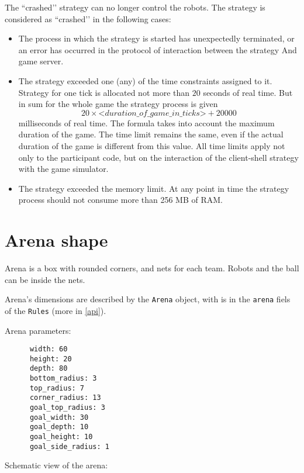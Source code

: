 The ``crashed’’ strategy can no longer control the robots. The strategy is considered as ``crashed’’ in the following cases:
\begin{itemize}
\item The process in which the strategy is started has unexpectedly terminated, or an error has occurred in the protocol of interaction between the strategy
      And game server.
\item The strategy exceeded one (any) of the time constraints assigned to it. Strategy for one tick is allocated not more than $20$ seconds
      of real time. But in sum for the whole game the strategy process is given
      \begin{equation}
      20\times\textit{<duration\_of\_game\_in\_ticks>}+20000
      \end{equation}
      milliseconds of real time.
      The formula takes into account the maximum duration of the game. The time limit remains the same, even if
      the actual duration of the game is different from this value. All time limits apply not only to the participant code, but
      on the interaction of the client-shell strategy with the game simulator.
\item The strategy exceeded the memory limit. At any point in time the strategy process should not consume more than 256 MB of RAM.
\end{itemize}

\section{Arena shape}\label{arena_form}

Arena is a box with rounded corners, and nets for each team. Robots and the ball can be inside the nets.

Arena's dimensions are described by the \texttt{Arena} object, with is in the \texttt{arena} fiels of the \texttt{Rules} (more in \ref{api}).

Arena parameters:

\begin{verbatim}
      width: 60
      height: 20
      depth: 80
      bottom_radius: 3
      top_radius: 7
      corner_radius: 13
      goal_top_radius: 3
      goal_width: 30
      goal_depth: 10
      goal_height: 10
      goal_side_radius: 1
\end{verbatim}

Schematic view of the arena:

